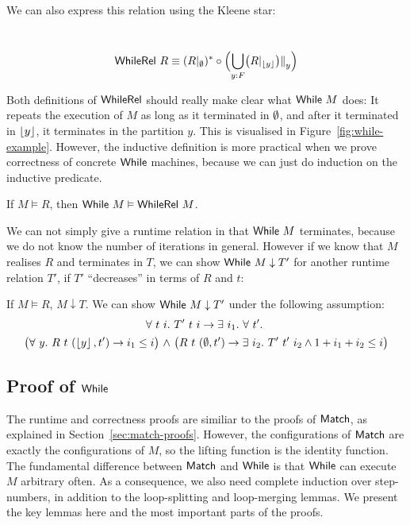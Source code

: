 We can also express this relation using the Kleene star:

\begin{lemma}
  ~
  \[
    \textsf{WhileRel}~R \equiv (R {|}_{\emptyset})^* \circ \Bigl( \bigcup_{y:F} \bigl( R {|}_{\left\lfloor {y} \right\rfloor} \bigr) {|\mkern-1.5mu|}_{y} \Bigr)
  \]
\end{lemma}

Both definitions of $\textsf{WhileRel}$ should really make clear what $\textsf{While}~M$ does: It repeats the execution of $M$ as long as it terminated in
$\emptyset$, and after it terminated in $\left\lfloor {y} \right\rfloor$, it terminates in the partition $y$.  This is visualised in Figure~\ref{fig:while-example}.  However,
the inductive definition is more practical when we prove correctness of concrete $\textsf{While}$ machines, because we can just do induction on the
inductive predicate.

\begin{lemma}
  \label{lem:While_Realise}
  If $M \vDash R$, then $\textsf{While}~M \vDash \textsf{WhileRel}~M$.
\end{lemma}


We can not simply give a runtime relation in that $\textsf{While}~M$ terminates, because we do not know the number of iterations in general.  However if we
know that $M$ realises $R$ and terminates in $T$, we can show $\textsf{While}~M \downarrow T'$ for another runtime relation $T'$, if $T'$ ``decreases'' in
terms of $R$ and $t$:

\begin{lemma}
  \label{lem:While_TerminatesIn}
  If $M \vDash R$, $M \downarrow T$.  We can show $\textsf{While}~M \downarrow T'$ under the following assumption:
  \begin{multline*}
    \forall~t~i.~
    T'~t~i \rightarrow
    \exists~i_1.~
    \forall~t'.~ \\
    \bigl(
    \forall~y.~ R~t~(\left\lfloor {y} \right\rfloor, t') \rightarrow i_1 \le i
    \bigl) ~\land~
    \bigl(
    R~t~(\emptyset, t') \rightarrow
    \exists~i_2.~
    T'~t'~i_2 \land
    1 + i_1 + i_2 \le i
    \bigr)
  \end{multline*}
\end{lemma}



\subsection{Proof of $\textsf{While}$}
\label{sec:while-proofs}

The runtime and correctness proofs are similiar to the proofs of $\textsf{Match}$, as explained in Section~\ref{sec:match-proofs}.  However, the
configurations of $\textsf{Match}$ are exactly the configurations of $M$, so the lifting function is the identity function.  The fundamental difference
between $\textsf{Match}$ and $\textsf{While}$ is that $\textsf{While}$ can execute $M$ arbitrary often.  As a consequence, we also need complete induction over step-numbers,
in addition to the loop-splitting and loop-merging lemmas.  We present the key lemmas here and the most important parts of the proofs.

